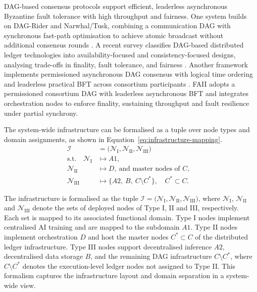 \documentclass[oneside,10pt]{swissi}
\begin{document}
DAG-based consensus protocols support efficient, leaderless asynchronous Byzantine fault tolerance with high throughput and fairness. One system builds on DAG-Rider and Narwhal/Tusk, combining a communication DAG with synchronous fast-path optimisation to achieve atomic broadcast without additional consensus rounds \cite{Spiegelman2022}. A recent survey classifies DAG-based distributed ledger technologies into availability-focused and consistency-focused designs, analysing trade-offs in finality, fault tolerance, and fairness \cite{Raikwar2025}. Another framework implements permissioned asynchronous DAG consensus with logical time ordering and leaderless practical BFT across consortium participants \cite{Choi2018}. FAII adopts a permissioned consortium DAG with leaderless asynchronous BFT and integrates orchestration nodes to enforce finality, sustaining throughput and fault resilience under partial synchrony.

The system-wide infrastructure can be formalised as a tuple over node types and domain assignments, as shown in Equation~\eqref{eq:infrastructure-mapping}.
\begin{align}
\label{eq:infrastructure-mapping}
\mathcal{I} &= \big( \mathcal{N}_\text{I}, \mathcal{N}_\text{II}, \mathcal{N}_\text{III} \big) \\
\text{s.t.} \quad
\mathcal{N}_\text{I} &\mapsto A1, \nonumber \\
\mathcal{N}_\text{II} &\mapsto D,\ \text{and master nodes of } C, \nonumber \\
\mathcal{N}_\text{III} &\mapsto \{A2,\ B,\ C\setminus C^*\},\quad C^* \subset C. \nonumber
\end{align}

The infrastructure is formalised as the tuple \( \mathcal{I} = \big( \mathcal{N}_\text{I}, \mathcal{N}_\text{II}, \mathcal{N}_\text{III} \big) \), where \( \mathcal{N}_\text{I} \), \( \mathcal{N}_\text{II} \) and \( \mathcal{N}_\text{III} \) denote the sets of deployed nodes of Type I, II and III, respectively. Each set is mapped to its associated functional domain. Type I nodes implement centralised AI training and are mapped to the subdomain \( A1 \). Type II nodes implement orchestration \( D \) and host the master nodes \( C^* \subset C \) of the distributed ledger infrastructure. Type III nodes support decentralised inference \( A2 \), decentralised data storage \( B \), and the remaining DAG infrastructure \( C \setminus C^* \), where \( C \setminus C^* \) denotes the execution-level ledger nodes not assigned to Type II. This formalism captures the infrastructure layout and domain separation in a system-wide view.
\end{document}
